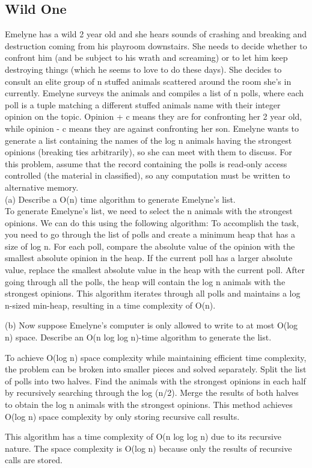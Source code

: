 \documentclass[12pt]{amsart}
\begin{document}
\subsection{Wild One} 
Emelyne has a wild 2 year old and she hears sounds of crashing and breaking and destruction coming from his playroom downstairs. She needs to decide whether to confront him (and be subject to his wrath and screaming) or to let him keep destroying things (which he seems to love to do these days). She decides to consult an elite group of n stuffed animals scattered around the room she's in currently. Emelyne surveys the animals and compiles a list of n polls, where each poll is a tuple matching a
different stuffed animals name with their integer opinion on the topic. Opinion + c means they are for
confronting her 2 year old, while opinion - c means they are against confronting her son. Emelyne wants to generate a list containing the names of the log n animals having the strongest opinions (breaking ties arbitrarily), so she can meet with them to discuss. For this problem, assume that the record containing the polls is read-only access controlled (the material in classified), so any computation must be written to alternative memory. 
\\

(a) Describe a O(n) time algorithm to generate Emelyne's list. 
\\

To generate Emelyne's list, we need to select the n animals with the strongest opinions. We can do this using the following algorithm:
To accomplish the task, you need to go through the list of polls and create a minimum heap that has a size of log n.
For each poll, compare the absolute value of the opinion with the smallest absolute opinion in the heap.
If the current poll has a larger absolute value, replace the smallest absolute value in the heap with the current poll.
After going through all the polls, the heap will contain the log n animals with the strongest opinions.
This algorithm iterates through all polls and maintains a log n-sized min-heap, resulting in a time complexity of O(n).

(b) Now suppose Emelyne's computer is only allowed to write to at most O(log n) space.
Describe an O(n log log n)-time algorithm to generate the list.

To achieve O(log n) space complexity while maintaining efficient time complexity, the problem can be broken into smaller pieces and solved separately.
Split the list of polls into two halves.
Find the animals with the strongest opinions in each half by recursively searching through the log (n/2).
Merge the results of both halves to obtain the log n animals with the strongest opinions.
This method achieves O(log n) space complexity by only storing recursive call results.

This algorithm has a time complexity of O(n log log n) due to its recursive nature. The space complexity is O(log n) because only the results of recursive calls are stored.
\end{document}
